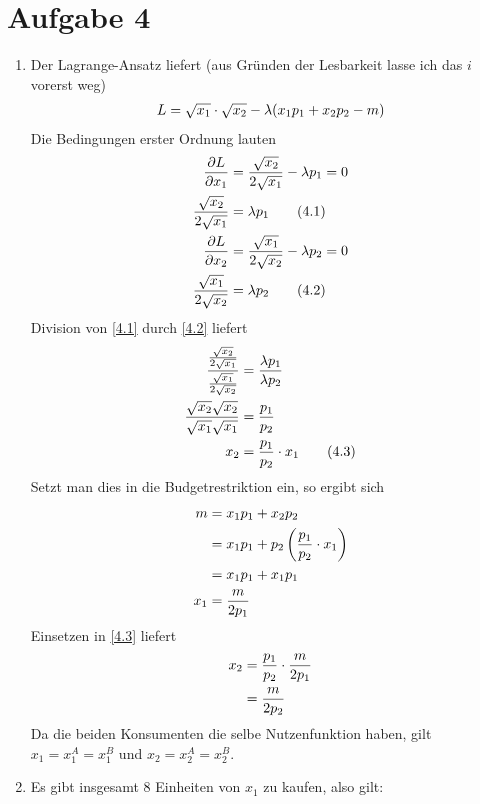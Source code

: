 \documentclass{article}
\begin{document}
	\section*{Aufgabe 4}
	\begin{enumerate}[label=(\alph*)]
		\item Der Lagrange-Ansatz liefert (aus Gründen der Lesbarkeit lasse ich das $i$ vorerst weg)
		\begin{align}
			L = \sqrt{x_1} \cdot \sqrt{x_2} - \lambda(x_1p_1 + x_2p_2 - m) \notag
		\end{align}
		Die Bedingungen erster Ordnung lauten
		\begin{align}
			\frac{\partial L}{\partial x_1} &= \frac{\sqrt{x_2}}{2\sqrt{x_1}} -\lambda p_1 = 0 \notag \\
			\label{4.1}
			\frac{\sqrt{x_2}}{2\sqrt{x_1}} &= \lambda p_1 \tag{4.1} \\
			\frac{\partial L}{\partial x_2} &= \frac{\sqrt{x_1}}{2\sqrt{x_2}} -\lambda p_2 = 0 \notag \\
			\label{4.2}
			\frac{\sqrt{x_1}}{2\sqrt{x_2}} &= \lambda p_2 \tag{4.2}
		\end{align}
		Division von \eqref{4.1} durch \eqref{4.2} liefert
		\begin{align}
			\frac{\frac{\sqrt{x_2}}{2\sqrt{x_1}}}{\frac{\sqrt{x_1}}{2\sqrt{x_2}}} &= \frac{\lambda p_1}{ \lambda p_2} \notag \\
			\frac{\sqrt{x_2}\sqrt{x_2}}{\sqrt{x_1}\sqrt{x_1}} &= \frac{p_1}{p_2} \notag \\
			\label{4.3}
			x_2 &= \frac{p_1}{p_2}\cdot x_1 \tag{4.3}
		\end{align}
		Setzt man dies in die Budgetrestriktion ein, so ergibt sich
		\begin{align}
			m &= x_1p_1 + x_2p_2 \notag \\
			&= x_1p_1 + p_2\left(\frac{p_1}{p_2}\cdot x_1\right) \notag \\
			&= x_1p_1 + x_1p_1 \notag \\
			x_1 &= \frac{m}{2p_1} \notag
		\end{align}
		Einsetzen in \eqref{4.3} liefert
		\begin{align}
			x_2 &= \frac{p_1}{p_2} \cdot \frac{m}{2p_1} \notag \\
			&= \frac{m}{2p_2} \notag
		\end{align}
		Da die beiden Konsumenten die selbe Nutzenfunktion haben, gilt $x_1=x_1^A=x_1^B$ und $x_2=x_2^A=x_2^B$.
		\item Es gibt insgesamt 8 Einheiten von $x_1$ zu kaufen, also gilt:

\end{enumerate}
\end{document}
